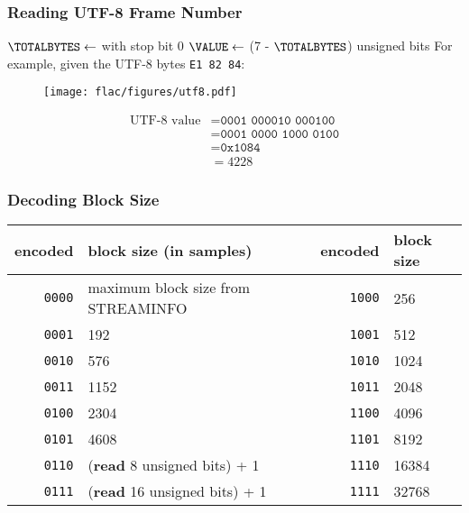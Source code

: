 \subsubsection{Reading UTF-8 Frame Number}
{
$\TOTALBYTES \leftarrow$ \UNARY with stop bit 0\;
$\VALUE \leftarrow$ \READ (7 - $\TOTALBYTES$) unsigned bits\;
\Return \VALUE\;
\EALGORITHM
}
For example, given the UTF-8 bytes \texttt{E1 82 84}:
\par
\begin{wrapfigure}[5]{l}{2.375in}
\texttt{[image: flac/figures/utf8.pdf]}
\end{wrapfigure}
\begin{align*}
\text{UTF-8 value} &= \texttt{0001 000010 000100} \\
&= \texttt{0001 0000 1000 0100} \\
&= \texttt{0x1084} \\
&= 4228
\end{align*}

\clearpage

\subsubsection{Decoding Block Size}
{
\begin{tabular}{rl||rl}
encoded & block size (in samples) &
encoded & block size \\
\hline
\texttt{0000} & maximum block size from STREAMINFO &
\texttt{1000} & 256 \\
\texttt{0001} & 192 &
\texttt{1001} & 512 \\
\texttt{0010} & 576 &
\texttt{1010} & 1024 \\
\texttt{0011} & 1152 &
\texttt{1011} & 2048 \\
\texttt{0100} & 2304 &
\texttt{1100} & 4096 \\
\texttt{0101} & 4608 &
\texttt{1101} & 8192 \\
\texttt{0110} & (\textbf{read} 8 unsigned bits) + 1 &
\texttt{1110} & 16384 \\
\texttt{0111} & (\textbf{read} 16 unsigned bits) + 1 &
\texttt{1111} & 32768 \\
\end{tabular}
}

